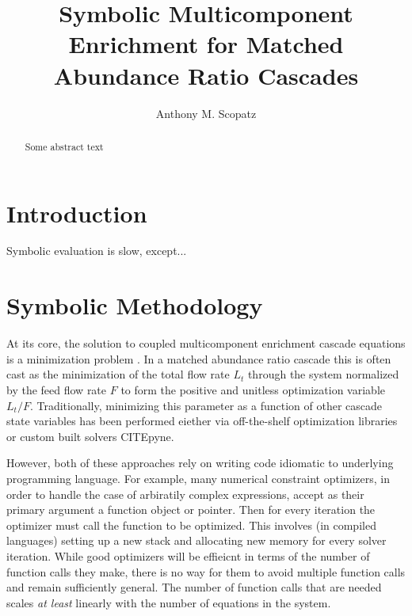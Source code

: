 \documentclass[preprint,12pt]{elsarticle}
\begin{document}
\begin{frontmatter}
\title{Symbolic Multicomponent Enrichment for Matched Abundance Ratio Cascades}

\author[chi]{Anthony M. Scopatz}

\address[chi]{The University of Chicago, The FLASH Center, 
              5754 S. Ellis Ave, Chicago, IL, 60637}


\begin{abstract}
Some abstract text
\end{abstract}

\begin{keyword}
\end{keyword}

\end{frontmatter}


%
%

\section{Introduction}
\label{sec:intro}
Symbolic evaluation is slow, except...


\section{Symbolic Methodology}
\label{sec:meth}
At its core, the solution to coupled multicomponent enrichment cascade equations is
a minimization problem \cite{Wood1999}.  In a matched abundance ratio 
\cite{DelaGarza1969} cascade this is often cast as the minimization of 
the total flow rate $L_t$ through the system normalized by the feed flow rate $F$ to 
form the positive and unitless optimization variable $L_t/F$.  Traditionally, 
minimizing this parameter as a function of other cascade state variables has been 
performed eiether via off-the-shelf optimization libraries 
\cite{doi:10.1080/01496391003793884} or custom built solvers CITEpyne.

However, both of these approaches rely on writing code idiomatic to underlying 
programming language.  For example, many numerical constraint optimizers, in order 
to handle the case of arbiratily complex expressions, accept as their primary 
argument a function object or pointer.  Then for every iteration the optimizer must 
call the function to be optimized.  This involves (in compiled languages) setting up 
a new stack and allocating new memory for every solver iteration.  While good 
optimizers will be effieicnt in terms of the number of function calls they make, 
there is no way for them to avoid multiple function calls and remain sufficiently 
general. The number of function calls that are needed scales \emph{at least} linearly 
with the number of equations in the system.
\end{document}

